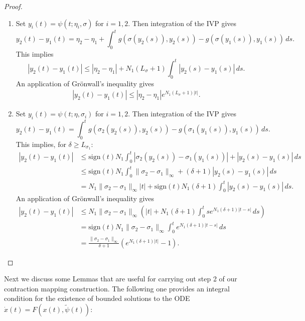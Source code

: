 \documentclass[a4paper]{siamart190516}
\newcommand{\sgn}{\text{sign}}
\begin{document}
 \begin{proof}
  \begin{enumerate}
\item Set $y_i(t) = \psi(t; \eta_i, \sigma)$ for $i=1,2$. Then integration of the IVP gives
\[
y_2(t)-y_1(t) = \eta_2 - \eta_1 + \int_0^t g(\sigma(y_2(s)),y_2(s)) - g(\sigma(y_1(s)),y_1(s)) \, ds.
\]
This implies
\[
|y_2(t)-y_1(t)| \leq |\eta_2 - \eta_1| + N_1 (L_{\sigma}+1) \int_0^t |y_2(s) -y_1(s)| \, ds.
\]
An application of Gr\"onwall's inequality gives
\begin{align*}
|y_2(t)-y_1(t)| \leq |\eta_2 - \eta_1| e^{N_1 (L_{\sigma}+1)|t|}.
\end{align*}

\item Set $y_i(t) = \psi(t; \eta, \sigma_i)$ for $i=1,2$.
Then integration of the IVP gives
\[
y_2(t)-y_1(t) = \int_0^t g(\sigma_2(y_2(s)),y_2(s)) - g(\sigma_1(y_1(s)),y_1(s)) \, ds.
\]
This implies, for $\delta \geq L_{\sigma_1}$:
\begin{align*}
|y_2(t)-y_1(t)| &\leq \sgn(t)  N_1  \int_0^t |\sigma_2(y_2(s)) - \sigma_1(y_1(s))| + |y_2(s) - y_1(s)| \, ds \\
&\leq \sgn(t)  N_1  \int_0^t \| \sigma_2 - \sigma_1 \|_{\infty} +  (\delta+ 1) |y_2(s) - y_1(s)| \, ds \\
&=  N_1  \| \sigma_2 - \sigma_1 \|_{\infty} |t| + \sgn(t) N_1  (\delta + 1)  \int_0^t |y_2(s) - y_1(s)| \, ds.
\end{align*}
An application of Gr\"onwall's inequality gives
\begin{align*}
|y_2(t)-y_1(t)| &\leq  N_1 \| \sigma_2 - \sigma_1 \|_{\infty} \left( |t| +  N_1  (\delta + 1) \int_0^t s e^{ N_1 (\delta+1)|t-s|}\, ds \right)  \\
&=  \sgn(t) N_1  \| \sigma_2 - \sigma_1 \|_{\infty} \int_0^t e^{ N_1 (\delta+1)|t-s|}\, ds \\
&= \frac{\| \sigma_2 - \sigma_1 \|_{\infty}}{\delta + 1} \left( e^{ N_1 (\delta+1)|t|} - 1 \right).
\end{align*}
   \end{enumerate}
 \end{proof}
 
Next we discuss some Lemmas that are useful for carrying out step 2 of our contraction mapping construction. The following one provides an integral condition for the existence of bounded solutions to the ODE $\dot{x}(t) = F(x(t),\tilde{\psi}(t))$:
 
\end{document}
